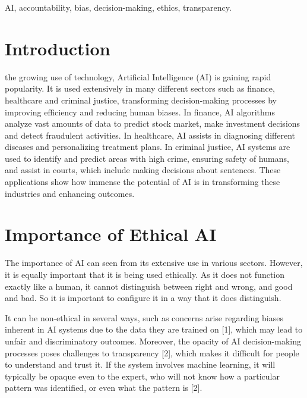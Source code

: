 \documentclass[journal]{IEEEtai}
\begin{document}
\begin{IEEEkeywords}
AI, accountability, bias, decision-making, ethics, transparency.

\end{IEEEkeywords}

\section{Introduction}

 the growing use of technology, Artificial Intelligence (AI) is gaining rapid popularity. It is used extensively in many different sectors such as finance, healthcare and criminal justice, transforming decision-making processes by improving efficiency and reducing human biases. In finance, AI algorithms analyze vast amounts of data to predict stock market, make investment decisions and detect fraudulent activities. In healthcare, AI assists in diagnosing different diseases and personalizing treatment plans. In criminal justice, AI systems are used to identify and predict areas with high crime, ensuring safety of humans, and assist in courts, which include making decisions about sentences. These applications show how immense the potential of AI is in transforming these industries and enhancing outcomes.

\section{Importance of Ethical AI}

The importance of AI can seen from its extensive use in various sectors. However, it is equally important that it is being used ethically. As it does not function exactly like a human, it cannot distinguish between right and wrong, and good and bad. So it is important to configure it in a way that it does distinguish.

It can be non-ethical in several ways, such as concerns arise regarding biases inherent in AI systems due to the data they are trained on [1], which may lead to unfair and discriminatory outcomes. Moreover, the opacity of AI decision-making processes poses challenges to transparency [2], which makes it difficult for people to understand and trust it. If the system involves machine learning, it will typically be opaque even to the expert, who will not know how a particular pattern was identified, or even what the pattern is [2].

\end{document}
